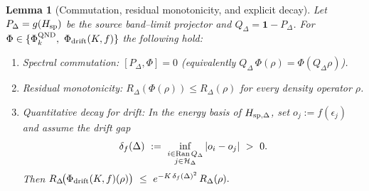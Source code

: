 \documentclass[10pt]{article}
\theoremstyle{definition}
\theoremstyle{plain}
\newtheorem{lemma}{Lemma}[section]
\begin{document}
\begin{lemma}[Commutation, residual monotonicity, and explicit decay]\label{lem:app-qnd-povm-compat}
Let \(P_\Delta=g(H_{{\rm sp}})\) be the source band–limit projector and \(Q_\Delta=\mathbf 1-P_\Delta\).
For \(\Phi\in\{\Phi^{\rm QND}_k,\ \Phi_{\rm drift}(K,f)\}\) the following hold:
\begin{enumerate}
\item[\emph{(a)}] \emph{Spectral commutation:} \([P_\Delta,\Phi]=0\) (equivalently \(Q_\Delta\,\Phi(\rho)=\Phi(Q_\Delta\rho)\)).
\item[\emph{(b)}] \emph{Residual monotonicity:} \(R_\Delta(\Phi(\rho))\le R_\Delta(\rho)\) for every density operator \(\rho\).
\item[\emph{(c)}] \emph{Quantitative decay for drift:} In the energy basis of \(H_{{\rm sp},\Delta}\), set \(o_j:=f(\epsilon_j)\) and
assume the \emph{drift gap}
\[
\delta_f(\Delta)\ :=\ \inf_{\substack{i\in{\rm Ran}\,Q_\Delta\\ j\in\mathcal H_\Delta}} |o_i-o_j|\ >\ 0.
\]
Then
\(
R_\Delta\!\big(\Phi_{\rm drift}(K,f)(\rho)\big)
\ \le\ e^{-K\,\delta_f(\Delta)^2}\,R_\Delta(\rho).
\)
\end{enumerate}
\end{lemma}
\end{document}
